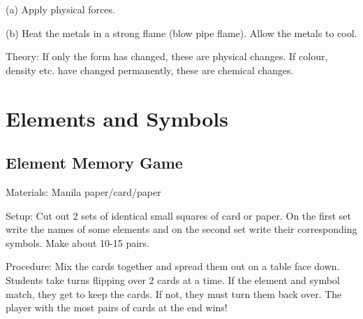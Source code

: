 \begin{multicols}{2}
\begin{description*}
{(a) Apply physical forces.

(b) Heat the metals in a strong flame (blow pipe
flame). Allow the metals to cool.}
\item[Theory:]{If only the form has changed, these are
physical changes. If colour, density etc. have
changed permanently, these are chemical
changes.}
\end{description*}


\section*{Elements and Symbols}


\subsection{Element Memory Game} %


\begin{description*}
\item[Materials:]{Manila paper/card/paper}
\item[Setup:]{Cut out 2 sets of identical small squares of card or paper. On the first set write the names of some elements and on the second set write their corresponding symbols. Make about 10-15 pairs. }
\item[Procedure:]{Mix the cards together and spread them out on a table face down. Students take turns flipping over 2 cards at a time. If the element and symbol match, they get to keep the cards. If not, they must turn them back over. The player with the most pairs of cards at the end wins!}
\end{description*}


\end{multicols}
